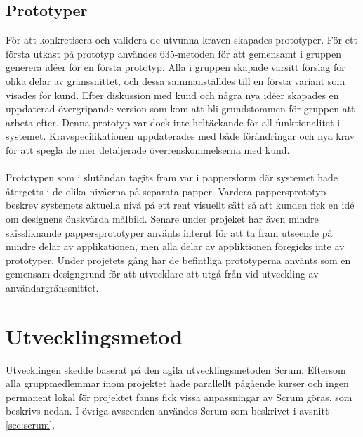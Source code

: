 \subsection{Prototyper}
\label{sec:prototypes}
För att konkretisera och validera de utvunna kraven skapades prototyper. För ett första utkast på prototyp användes 635-metoden \cite{arvolaboken} för att gemensamt i gruppen generera idéer för en första prototyp. Alla i gruppen skapade varsitt förslag för olika delar av gränssnittet, och dessa sammanställdes till en första variant som visades för kund. Efter diskussion med kund och några nya idéer skapades en uppdaterad övergripande version som kom att bli grundstommen för gruppen att arbeta efter. Denna prototyp var dock inte heltäckande för all funktionalitet i systemet. Kravspecifikationen uppdaterades med både förändringar och nya krav för att spegla de mer detaljerade överrenskommelserna med kund. 
\\ \\
Prototypen som i slutändan tagits fram var i pappersform där systemet hade återgetts i de olika nivåerna på separata papper. Vardera pappersprototyp beskrev systemets aktuella nivå på ett rent visuellt sätt så att kunden fick en idé om designens önskvärda målbild. Senare under projeket har även mindre skissliknande pappersprototyper använts internt för att ta fram utseende på mindre delar av applikationen, men alla delar av appliktionen föregicks inte av prototyper. Under projetets gång har de befintliga prototyperna använts som en gemensam designgrund för att utvecklare att utgå från vid utveckling av användargränssnittet.

\section{Utvecklingsmetod}
\label{sec:development-methodology}
Utvecklingen skedde baserat på den agila utvecklingsmetoden Scrum. Eftersom alla gruppmedlemmar inom
projektet hade parallellt pågående kurser och ingen permanent lokal för projektet fanns fick
vissa anpassningar av Scrum göras, som beskrivs nedan. I övriga avseenden användes Scrum som beskrivet
i avsnitt \ref{sec:scrum}.

